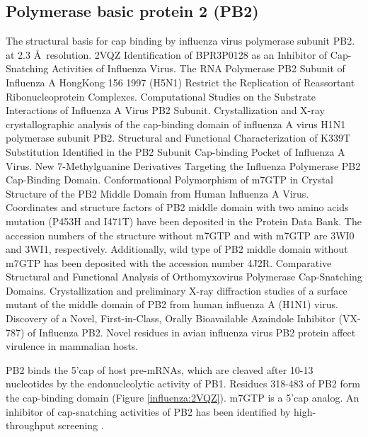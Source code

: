 \subsection{Polymerase basic protein 2 (PB2)}


\citep{1192} The structural basis for cap binding by influenza virus polymerase subunit PB2. at 2.3 \AA\ resolution. 2VQZ
\citep{1236} Identification of BPR3P0128 as an Inhibitor of Cap-Snatching Activities of Influenza Virus.%
\citep{1552} The RNA Polymerase PB2 Subunit of Influenza A HongKong 156 1997 (H5N1) Restrict the Replication of Reassortant Ribonucleoprotein Complexes.%
\citep{1553} Computational Studies on the Substrate Interactions of Influenza A Virus PB2 Subunit.%
\citep{1551} Crystallization and X-ray crystallographic analysis of the cap-binding domain of influenza A virus H1N1 polymerase subunit PB2.%
\citep{1554} Structural and Functional Characterization of K339T Substitution Identified in the PB2 Subunit Cap-binding Pocket of Influenza A Virus.%
\citep{1557} New 7-Methylguanine Derivatives Targeting the Influenza Polymerase PB2 Cap-Binding Domain.%
\citep{1546} Conformational Polymorphism of m7GTP in Crystal Structure of the PB2 Middle Domain from Human Influenza A Virus. Coordinates and structure factors of PB2 middle domain with two amino acids mutation (P453H and I471T) have been deposited in the Protein Data Bank. The accession numbers of the structure without m7GTP and with m7GTP are 3WI0 and 3WI1, respectively. Additionally, wild type of PB2 middle domain without m7GTP has been deposited with the accession number 4J2R.%
\citep{1560} Comparative Structural and Functional Analysis of Orthomyxovirus Polymerase Cap-Snatching Domains.%
\citep{1555} Crystallization and preliminary X-ray diffraction studies of a surface mutant of the middle domain of PB2 from human influenza A (H1N1) virus.%
\citep{1558} Discovery of a Novel, First-in-Class, Orally Bioavailable Azaindole Inhibitor (VX-787) of Influenza PB2.%
\citep{1556} Novel residues in avian influenza virus PB2 protein affect virulence in mammalian hosts.%

PB2 binds the 5'cap of host pre-mRNAs, which are cleaved after 10-13 nucleotides by the endonucleolytic activity of PB1. Residues 318-483 of PB2 form the cap-binding domain (Figure \ref{influenza:2VQZ}). m7GTP is a 5'cap analog. An inhibitor of cap-snatching activities of PB2 has been identified by high-throughput screening \citep{1236}.

